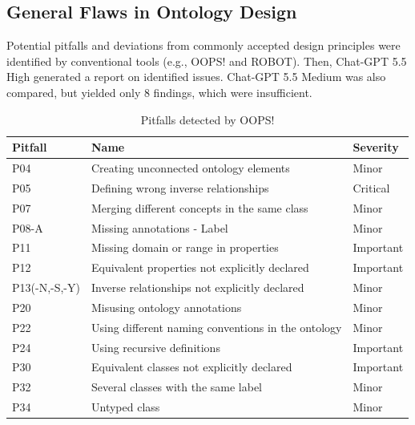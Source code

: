 \documentclass[
]{ceurart}
\begin{document}
\subsection{General Flaws in Ontology Design}
Potential pitfalls and deviations from commonly accepted design principles were identified by conventional tools (e.g., OOPS! and ROBOT). Then, Chat-GPT 5.5 High generated a report on identified issues. Chat-GPT 5.5 Medium was also compared, but yielded only 8 findings, which were insufficient.  

\begin{table} [t]
    \centering
    \caption{Pitfalls detected by OOPS!}
    \label{tab:OOPS}
    \begin{tabular}{lll} \toprule
        Pitfall & Name & Severity \\
\midrule
        P04 & Creating unconnected ontology elements & Minor \\
        P05 & Defining wrong inverse relationships  & Critical \\
        P07 & Merging different concepts in the same class & Minor \\
        P08-A & Missing annotations - Label & Minor \\
        P11 & Missing domain or range in properties & Important \\
        P12 & Equivalent properties not explicitly declared & Important \\
        P13(-N,-S,-Y) &Inverse relationships not explicitly declared  & Minor \\
        P20 & Misusing ontology annotations & Minor \\
        P22 & Using different naming conventions in the ontology & Minor \\
        P24 & Using recursive definitions & Important \\
        P30 & Equivalent classes not explicitly declared  & Important \\
        P32 & Several classes with the same label & Minor \\
        P34 & Untyped class & Minor \\ \bottomrule
    \end{tabular}
\end{table}
\end{document}
